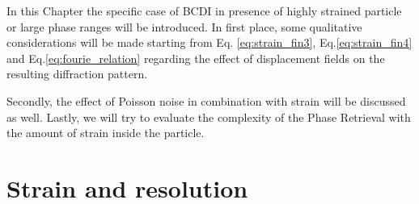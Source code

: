 In this Chapter the specific case of BCDI in presence of highly strained particle or large phase ranges will be introduced. 
In first place, some qualitative considerations will be made starting from Eq. \ref{eq:strain_fin3}, Eq.\ref{eq:strain_fin4} and 
Eq.\ref{eq:fourie_relation} regarding the effect of displacement fields on the resulting diffraction pattern. 

Secondly, the effect of Poisson noise in combination with strain will be discussed as well. 
Lastly, we will try to evaluate the complexity of the Phase Retrieval with the amount of strain inside the particle. 

\section{Strain and resolution}